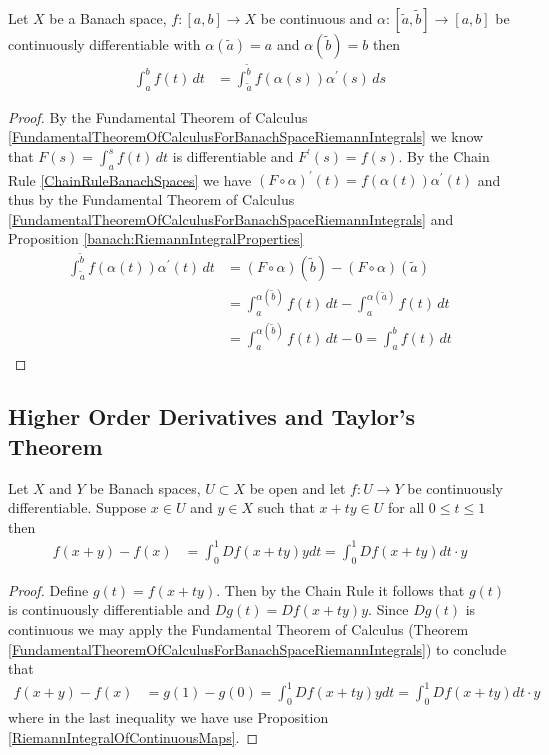 \begin{thm}\label{banach:RiemannIntegralChangeOfVariables}Let
 $X$ be a Banach space, $f : [a,b] \to X$ be continuous and $\alpha : [\tilde{a}, \tilde{b}] \to [a,b]$ be continuously 
differentiable with $\alpha(\tilde{a}) = a$ and $\alpha(\tilde{b}) = b$ then
\begin{align*}
\int_a^b f(t) \, dt &= \int_{\tilde{a}}^{\tilde{b}} f(\alpha(s)) \alpha^\prime(s) \, ds
\end{align*}
\end{thm}
\begin{proof}
  By the Fundamental Theorem of Calculus \ref{FundamentalTheoremOfCalculusForBanachSpaceRiemannIntegrals} we know that $F(s) =  \int_a^s f(t) \, dt$ is differentiable and
  $F^\prime(s) = f(s)$.   By the Chain Rule \ref{ChainRuleBanachSpaces} we have $(F \circ \alpha)^\prime(t) = f(\alpha(t)) \alpha^\prime(t)$ and thus by the Fundamental Theorem of Calculus \ref{FundamentalTheoremOfCalculusForBanachSpaceRiemannIntegrals}  and Proposition \ref{banach:RiemannIntegralProperties}
  \begin{align*}
    \int_{\tilde{a}}^{\tilde{b}} f(\alpha(t)) \alpha^\prime(t) \, dt &= (F \circ \alpha)(\tilde{b}) -(F \circ \alpha)(\tilde{a}) \\
                                                                     &= \int_a^{\alpha(\tilde{b})} f(t) \, dt - \int_a^{\alpha(\tilde{a})} f(t) \, dt \\
                                                                     &= \int_a^{\alpha(\tilde{b})} f(t) \, dt - 0 = \int_a^b f(t) \, dt
  \end{align*}
\end{proof}

\subsection{Higher Order Derivatives and Taylor's Theorem}

\begin{thm}\label{MeanValueTheoremBanachSpaces}Let
  $X$ and $Y$ be  Banach spaces, $U \subset X$ be open and let $f : U
  \to Y$ be continuously differentiable.  Suppose $x \in U$ and $y \in
  X$ such that $x + ty \in U$ for all $0 \leq t \leq 1$ then
\begin{align*}
f(x + y) - f(x) &= \int_0^1 Df(x + ty) y dt = \int_0^1 Df(x + ty) dt
                  \cdot y
\end{align*}
\end{thm}
\begin{proof}
Define $g(t) = f(x + ty)$.  Then by the Chain Rule it follows that
$g(t)$ is continuously differentiable and $Dg(t) = Df(x + ty) y$.
Since $Dg(t)$ is continuous we may apply the Fundamental Theorem of
Calculus (Theorem
\ref{FundamentalTheoremOfCalculusForBanachSpaceRiemannIntegrals}) to
conclude that 
\begin{align*}
f(x+y) - f(x) &= g(1) - g(0) = \int_0^1 Df(x+ty) y dt = \int_0^1
                Df(x+ty) dt \cdot y
\end{align*}
where in the last inequality we have use Proposition \ref{RiemannIntegralOfContinuousMaps}.
\end{proof}

